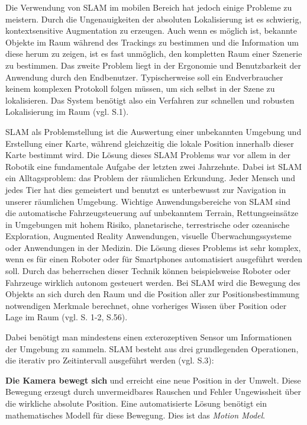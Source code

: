 Die Verwendung von SLAM im mobilen Bereich hat jedoch einige Probleme zu meistern. Durch die Ungenauigkeiten der absoluten Lokalisierung ist es schwierig, kontextsensitive Augmentation zu erzeugen. Auch wenn es möglich ist, bekannte Objekte im Raum während des Trackings zu bestimmen und die Information um diese herum zu zeigen, ist es fast unmöglich, den kompletten Raum einer Szenerie zu bestimmen. Das zweite Problem liegt in der Ergonomie und Benutzbarkeit der Anwendung durch den Endbenutzer. Typischerweise soll ein Endverbraucher keinem komplexen Protokoll folgen müssen, um sich selbst in der Szene zu lokalisieren. Das System benötigt also ein Verfahren zur schnellen und robusten Lokalisierung im Raum (vgl. \cite{slam_mobile} S.1).

SLAM als Problemstellung ist die Auswertung einer unbekannten Umgebung und Erstellung einer Karte, während gleichzeitig die lokale Position innerhalb dieser Karte bestimmt wird. Die Lösung dieses SLAM Problems war vor allem in der Robotik eine fundamentale Aufgabe der letzten zwei Jahrzehnte. Dabei ist SLAM ein Alltagsproblem: das Problem der räumlichen Erkundung. Jeder Mensch und jedes Tier hat dies gemeistert und benutzt es unterbewusst zur Navigation in unserer räumlichen Umgebung. Wichtige Anwendungsbereiche von SLAM sind die automatische Fahrzeugsteuerung auf unbekanntem Terrain, Rettungseinsätze in Umgebungen mit hohem Risiko, planetarische, terrestrische oder ozeanische Exploration, Augmented Reality Anwendungen, visuelle Überwachungssysteme oder Anwendungen in der Medizin. Die Lösung dieses Problems ist sehr komplex, wenn es für einen Roboter oder für Smartphones automatisiert ausgeführt werden soll. Durch das beherrschen dieser Technik können beispielsweise Roboter oder Fahrzeuge wirklich autonom gesteuert werden. Bei SLAM wird die Bewegung des Objekts an sich durch den Raum und die Position aller zur Positionsbestimmung notwendigen Merkmale berechnet, ohne vorheriges Wissen über Position oder Lage im Raum (vgl. \cite{slam} S. 1-2, \cite{survey} S.56).

Dabei benötigt man mindestens einen exterozeptiven Sensor um Informationen der Umgebung zu sammeln.
SLAM besteht aus drei grundlegenden Operationen, die iterativ pro Zeitintervall ausgeführt werden (vgl. \cite{ekf_slam} S.3):

\textbf{Die Kamera bewegt sich} und erreicht eine neue Position in der Umwelt. Diese Bewegung erzeugt durch unvermeidbares Rauschen und Fehler Ungewissheit über die wirkliche absolute Position. Eine automatisierte Lösung benötigt ein mathematisches Modell für diese Bewegung. Dies ist das \glqq\textit{Motion Model}\grqq{}.

